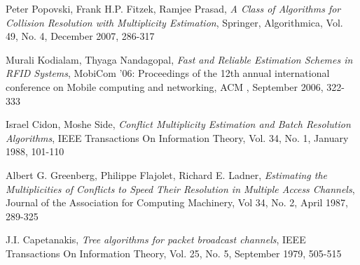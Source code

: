 \begin{thebibliography}{99}
 
  Peter Popovski, Frank H.P. Fitzek, Ramjee Prasad, \emph{ A Class of Algorithms for Collision Resolution with Multiplicity Estimation}, Springer, Algorithmica, Vol. 49, No. 4, December 2007, 286-317
  
Murali Kodialam, Thyaga Nandagopal, \emph{Fast and Reliable Estimation Schemes in RFID Systems}, MobiCom '06: Proceedings of the 12th annual international conference on Mobile computing and networking, ACM , September 2006, 322-333 
 
 Israel Cidon, Moshe Side, \emph{Conflict Multiplicity Estimation and Batch Resolution Algorithms}, IEEE Transactions On Information Theory, Vol. 34, No. 1, January 1988, 101-110
 
  Albert G. Greenberg, Philippe Flajolet,  Richard E. Ladner,
  \emph{Estimating the Multiplicities of Conflicts to Speed Their Resolution in Multiple Access Channels},
  Journal of the Association for Computing Machinery,
  Vol 34, No. 2, April 1987, 289-325
  
  J.I. Capetanakis, \emph{ Tree algorithms for packet broadcast channels}, IEEE Transactions On Information Theory, Vol. 25, No. 5, September 1979, 505-515
 \end{thebibliography}